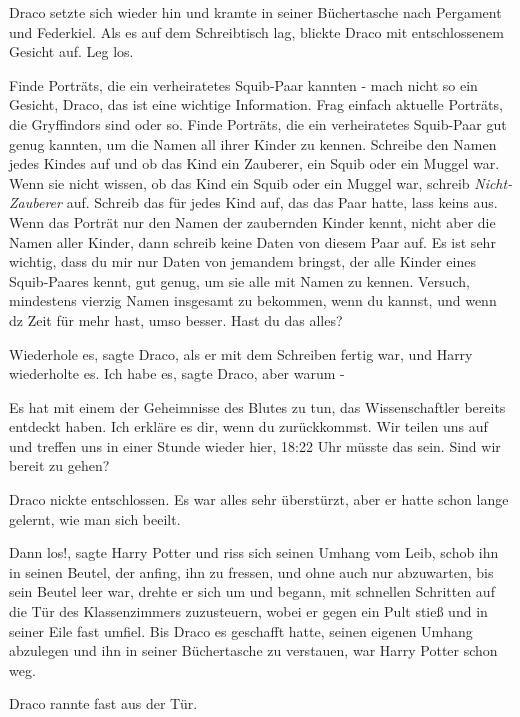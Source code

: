 Draco setzte sich wieder hin und kramte in seiner Büchertasche nach Pergament
und Federkiel. Als es auf dem Schreibtisch lag, blickte Draco mit entschlossenem
Gesicht auf. \glqq Leg los.\grqq{}

\glqq Finde Porträts, die ein verheiratetes Squib-Paar kannten - mach nicht so
ein Gesicht, Draco, das ist eine wichtige Information. Frag einfach aktuelle
Porträts, die Gryffindors sind oder so. Finde Porträts, die ein verheiratetes
Squib-Paar gut genug kannten, um die Namen all ihrer Kinder zu kennen. Schreibe
den Namen jedes Kindes auf und ob das Kind ein Zauberer, ein Squib oder ein
Muggel war. Wenn sie nicht wissen, ob das Kind ein Squib oder ein Muggel war,
schreib \emph{\glqq Nicht-Zauberer\grqq{} } auf. Schreib das für jedes Kind auf,
das das Paar hatte, lass keins aus. Wenn das Porträt nur den Namen der
zaubernden Kinder kennt, nicht aber die Namen aller Kinder, dann schreib keine
Daten von diesem Paar auf. Es ist sehr wichtig, dass du mir nur Daten von
jemandem bringst, der alle Kinder eines Squib-Paares kennt, gut genug, um sie
alle mit Namen zu kennen. Versuch, mindestens vierzig Namen insgesamt zu
bekommen, wenn du kannst, und wenn dz Zeit für mehr hast, umso besser. Hast du
das alles?\grqq{}

\glqq Wiederhole es\grqq{}, sagte Draco, als er mit dem Schreiben fertig war,
und Harry wiederholte es. \glqq Ich habe es\grqq{}, sagte Draco, \glqq aber
warum -\grqq{}

\glqq Es hat mit einem der Geheimnisse des Blutes zu tun, das Wissenschaftler
bereits entdeckt haben. Ich erkläre es dir, wenn du zurückkommst. Wir teilen uns
auf und treffen uns in einer Stunde wieder hier, 18:22 Uhr müsste das sein. Sind
wir bereit zu gehen?\grqq{}

Draco nickte entschlossen. Es war alles sehr überstürzt, aber er hatte schon
lange gelernt, wie man sich beeilt.

\glqq Dann los!\grqq{}, sagte Harry Potter und riss sich seinen Umhang vom Leib,
schob ihn in seinen Beutel, der anfing, ihn zu fressen, und ohne auch nur
abzuwarten, bis sein Beutel leer war, drehte er sich um und begann, mit
schnellen Schritten auf die Tür des Klassenzimmers zuzusteuern, wobei er gegen
ein Pult stieß und in seiner Eile fast umfiel. Bis Draco es geschafft hatte,
seinen eigenen Umhang abzulegen und ihn in seiner Büchertasche zu verstauen, war
Harry Potter schon weg.

Draco rannte fast aus der Tür.


